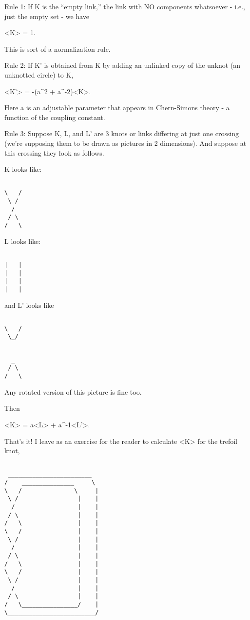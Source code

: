 Rule 1: If K is the ``empty link,'' the link with NO components
whatsoever - i.e., just the empty set - we have 

<K> = 1.   

This is sort of a normalization rule.

Rule 2:  If K' is obtained from K by adding an unlinked copy of the
unknot (an unknotted circle) to K, 

<K'> = -(a^2 + a^{-2})<K>.  

Here a is an adjustable parameter that appears in Chern-Simons theory -
a function of the coupling constant.

Rule 3: Suppose K, L, and L' are 3 knots or links differing at just
one crossing (we're supposing them to be drawn as pictures in 2
dimensions).   And suppose at this crossing they look as follows.

K looks like:


\begin{verbatim}

\   /
 \ /
  /
 / \
/   \
\end{verbatim}
    

L looks like:


\begin{verbatim}

|   |
|   |
|   |
|   |
\end{verbatim}
    

and L' looks like


\begin{verbatim}

\   /
 \_/
\end{verbatim}
    


\begin{verbatim}

  _
 / \
/   \
\end{verbatim}
    

Any rotated version of this picture is fine too.

Then 

<K> = a<L> + a^{-1}<L'>.


That's it!  I leave as an exercise for the reader to calculate
<K> for the trefoil knot,


\begin{verbatim}

 ________________________
/    _______________     \ 
\   /               \     |
 \ /                 |    |
  /                  |    |    
 / \                 |    |
/   \                |    |
\   /                |    |
 \ /                 |    |
  /                  |    |    
 / \                 |    |
/   \                |    |
\   /                |    |
 \ /                 |    |
  /                  |    |    
 / \                 |    |
/   \________________/    |
\_________________________/

\end{verbatim}
    


